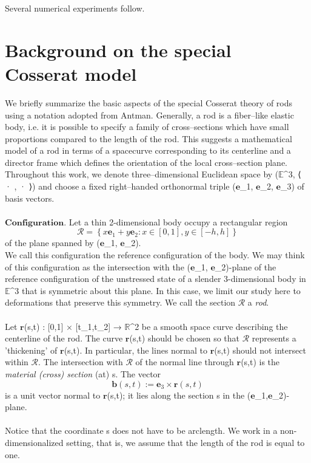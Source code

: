 \documentclass[12pt]{article}
\begin{document}
Several numerical experiments follow.

\section{Background on the special Cosserat model}
We briefly summarize the basic aspects of the special Cosserat theory of rods using a notation adopted from Antman. Generally, a rod is a fiber–like elastic body, i.e. it is possible to specify a family of cross–sections which have small proportions compared to the length of the rod. This suggests a mathematical model of a rod in terms of a spacecurve corresponding to its centerline and a director frame which defines the orientation of the local cross–section plane.
Throughout this work, we denote three–dimensional Euclidean space by ($\mathbb{E}$^3, ⟨ · , · ⟩) and choose a fixed right–handed orthonormal triple ($\mathbf{e}$_1, $\mathbf{e}$_2, $\mathbf{e}$_3) of basis vectors.\\\\
$\mathbf{Configuration.}$ Let a thin 2-dimensional body occupy a rectangular region
\[  \mathcal{R}= \left \{
x\mathbf{e}_1 + y\mathbf{e}_2: x\in[0,1] ,y\in[-h,h] 
\right \}\]
of the plane spanned by ($\mathbf{e}$_1, $\mathbf{e}$_2).\\

We call this configuration the reference configuration of the body.
We may think of this configuration as the intersection with the ($\mathbf{e}$_1, $\mathbf{e}$_2)-plane of the reference configuration of the unstressed state of a slender 3-dimensional body in $\mathbb{E}$^3 that is symmetric about this plane. In this case, we limit our study here to deformations that preserve this symmetry. We call the section $\mathcal{R}$ a \emph{rod}.
\\\\
Let $\mathbf{r}$(s,t) : [0,1] × [t_1,t_2] → $\mathbb{R}$^2 be a smooth space curve describing the centerline of the rod.  The curve $\mathbf{r}$(s,t) should be chosen so that $\mathcal{R}$ represents a 'thickening' of $\mathbf{r}$(s,t). In particular, the lines normal to $\mathbf{r}$(s,t) should not intersect within $\mathcal{R}$. The intersection with $\mathcal{R}$ of the normal line through $\mathbf{r}$(s,t) is the \emph{material (cross) section} (at) s.  The vector 
\[ \mathbf{b}(s,t) := \mathbf{e}_3\times\mathbf{r}(s,t) \]
is a unit vector normal to $\mathbf{r}$(s,t); it lies along the section s in the ($\mathbf{e}$_1,$\mathbf{e}$_2)-plane.
\\\\
Notice that the coordinate s does not have to be arclength.
We work in a non-dimensionalized setting, that is, we assume that the length of the rod is equal to one. 
\end{document}
